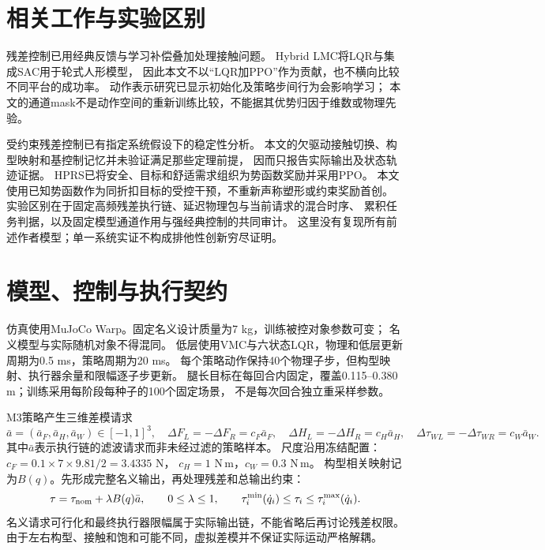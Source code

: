 \documentclass[UTF8,a4paper,11pt]{ctexart}
\begin{document}
\section{相关工作与实验区别}
残差控制已用经典反馈与学习补偿叠加处理接触问题\cite{residual}。
Hybrid LMC将LQR与集成SAC用于轮式人形模型\cite{hybrid}，
因此本文不以``LQR加PPO''作为贡献，也不横向比较不同平台的成功率。
动作表示研究已显示初始化及策略步间行为会影响学习\cite{action}；
本文的通道mask不是动作空间的重新训练比较，不能据其优势归因于维数或物理先验。

受约束残差控制已有指定系统假设下的稳定性分析\cite{crrl}。
本文的欠驱动接触切换、构型映射和基控制记忆并未验证满足那些定理前提，
因而只报告实际输出及状态轨迹证据。
HPRS已将安全、目标和舒适需求组织为势函数奖励并采用PPO\cite{hprs}。
本文使用已知势函数作为同折扣目标的受控干预，不重新声称塑形或约束奖励首创。
实验区别在于固定高频残差执行链、延迟物理包与当前请求的混合时序、
累积任务判据，以及固定模型通道作用与强经典控制的共同审计。
这里没有复现所有前述作者模型；单一系统实证不构成排他性创新穷尽证明。

\section{模型、控制与执行契约}
仿真使用MuJoCo Warp。固定名义设计质量为7 kg，训练被控对象参数可变；
名义模型与实际随机对象不得混同。
低层使用VMC与六状态LQR，物理和低层更新周期为0.5 ms，策略周期为20 ms。
每个策略动作保持40个物理子步，但构型映射、执行器余量和限幅逐子步更新。
腿长目标在每回合内固定，覆盖0.115--0.380 m；训练采用每阶段每种子的100个固定场景，
不是每次回合独立重采样参数。

M3策略产生三维差模请求
\begin{equation}
 \bar a=(\bar a_F,\bar a_H,\bar a_W)\in[-1,1]^3,\quad
 \Delta F_L=-\Delta F_R=c_F \bar a_F,\quad
 \Delta H_L=-\Delta H_R=c_H \bar a_H,\quad
 \Delta \tau_{WL}=-\Delta \tau_{WR}=c_W \bar a_W .
\end{equation}
其中$\bar a$表示执行链的滤波请求而非未经过滤的策略样本。
尺度沿用冻结配置：$c_F=0.1\times7\times9.81/2=3.4335$ N，
$c_H=1$ N\,m，$c_W=0.3$ N\,m。
构型相关映射记为$B(q)$。先形成完整名义输出，再处理残差和总输出约束：
\begin{equation}
 \tau=\tau_{\rm nom}+\lambda B(q)\bar a,\qquad 0\leq\lambda\leq1,
 \qquad \tau_i^{\min}(\dot q_i)\leq\tau_i\leq\tau_i^{\max}(\dot q_i).
\end{equation}
名义请求可行化和最终执行器限幅属于实际输出链，不能省略后再讨论残差权限。
由于左右构型、接触和饱和可能不同，虚拟差模并不保证实际运动严格解耦。
\end{document}
